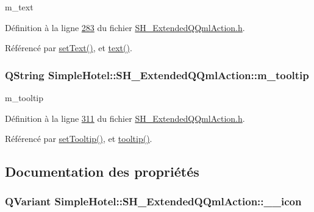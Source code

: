 m\-\_\-text 



Définition à la ligne \hyperlink{SH__ExtendedQQmlAction_8h_source_l00283}{283} du fichier \hyperlink{SH__ExtendedQQmlAction_8h_source}{S\-H\-\_\-\-Extended\-Q\-Qml\-Action.\-h}.



Référencé par \hyperlink{classSimpleHotel_1_1SH__ExtendedQQmlAction_a5ba76040e3a1e2f5b1fe8e4059ade2b0}{set\-Text()}, et \hyperlink{classSimpleHotel_1_1SH__ExtendedQQmlAction_a7601e3f7de921cd81d0e6e6bd8c3f1df}{text()}.

\hypertarget{classSimpleHotel_1_1SH__ExtendedQQmlAction_ac8031b4c01e3dde52765d4ed1d607951}{
\subsubsection[{m\-\_\-tooltip}]{\setlength{\rightskip}{0pt plus 5cm}Q\-String Simple\-Hotel\-::\-S\-H\-\_\-\-Extended\-Q\-Qml\-Action\-::m\-\_\-tooltip\hspace{0.3cm}{\ttfamily [private]}}}\label{classSimpleHotel_1_1SH__ExtendedQQmlAction_ac8031b4c01e3dde52765d4ed1d607951}


m\-\_\-tooltip 



Définition à la ligne \hyperlink{SH__ExtendedQQmlAction_8h_source_l00311}{311} du fichier \hyperlink{SH__ExtendedQQmlAction_8h_source}{S\-H\-\_\-\-Extended\-Q\-Qml\-Action.\-h}.



Référencé par \hyperlink{classSimpleHotel_1_1SH__ExtendedQQmlAction_a1ecfeb91b59df8d0e9e51b67c6835247}{set\-Tooltip()}, et \hyperlink{classSimpleHotel_1_1SH__ExtendedQQmlAction_a182c5f68e59fe9e0e11e20a0ae7d35dd}{tooltip()}.



\subsection{Documentation des propriétés}
\hypertarget{classSimpleHotel_1_1SH__ExtendedQQmlAction_a8903621d83447b07f21fb419845e956a}{
\subsubsection[{\-\_\-\-\_\-icon}]{\setlength{\rightskip}{0pt plus 5cm}Q\-Variant Simple\-Hotel\-::\-S\-H\-\_\-\-Extended\-Q\-Qml\-Action\-::\-\_\-\-\_\-icon\hspace{0.3cm}{\ttfamily [read]}}}\label{classSimpleHotel_1_1SH__ExtendedQQmlAction_a8903621d83447b07f21fb419845e956a}


